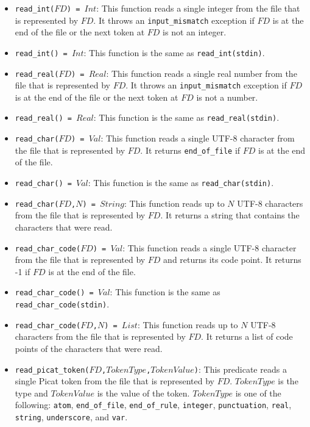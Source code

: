 \begin{itemize}
\item \texttt{read\_int($FD$) = $Int$}: This function reads a single integer from the file that is represented by $FD$. It throws an {\tt input\_mismatch} exception if $FD$ is at the end of the file or the next token at $FD$ is not an integer.

\item \texttt{read\_int() = $Int$}: This function is the same as \texttt{read\_int(stdin)}.
\item \texttt{read\_real($FD$) = $Real$}: This function reads a single real number from the file that is represented by $FD$. It throws an {\tt input\_mismatch} exception if $FD$ is at the end of the file or the next token at $FD$ is not a number.
\item \texttt{read\_real() = $Real$}: This function is the same as \texttt{read\_real(stdin)}.
\item \texttt{read\_char($FD$) = $Val$}: This function reads a single UTF-8 character from the file that is represented by $FD$. It returns {\tt end\_of\_file} if $FD$ is at the end of the file.
\item \texttt{read\_char() = $Val$}: This function is the same as \texttt{read\_char(stdin)}.
\item \texttt{read\_char($FD$,$N$) = $String$}: This function reads up to $N$ UTF-8 characters from the file that is represented by $FD$.  It returns a string that contains the characters that were read.
\item \texttt{read\_char\_code($FD$) = $Val$}: This function reads a single UTF-8 character from the file that is represented by $FD$ and returns its code point. It returns -1 if $FD$ is at the end of the file.
\item \texttt{read\_char\_code() = $Val$}: This function is the same as \texttt{read\_char\_code(stdin)}.
\item \texttt{read\_char\_code($FD$,$N$) = $List$}: This function reads up to $N$ UTF-8 characters from the file that is represented by $FD$.  It returns a list of code points of the characters that were read.
\item \texttt{read\_picat\_token($FD$,$TokenType$,$TokenValue$)}: This predicate reads a single Picat token from the file that is represented by $FD$. $TokenType$ is the type and $TokenValue$ is the value of the token. $TokenType$ is one of the following: \texttt{atom}, \texttt{end\_of\_file}, \texttt{end\_of\_rule}, \texttt{integer}, \texttt{punctuation}, \texttt{real},  \texttt{string},  \texttt{underscore}, and \texttt{var}.

\end{itemize}
